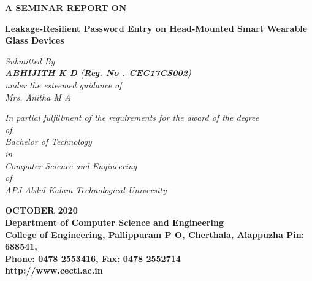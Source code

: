 \documentclass[12pt,a4paper,oneside]{report}
\begin{document}
\begin{titlepage}
\begin{center}

\large{\textbf{A SEMINAR REPORT ON}}\\
\begin{singlespace}
\LARGE{\textbf{Leakage-Resilient Password Entry on Head-Mounted Smart Wearable Glass Devices}}\\
\end{singlespace}


\Large{\textit{Submitted By }}\\
\Large{\textit{\textbf{ABHIJITH K D}     (\textbf{Reg. No . CEC17CS002})}}\\
\Large{\textit{\textit{under the esteemed guidance of}}}\\
\Large{\textit{Mrs. Anitha M A}}\\
\begin{singlespace}
\large{\textit{In partial fulfillment of the requirements for the award of the degree}\\
\large{ \textit{of}}\\
\large{\textit{Bachelor of Technology} }\\
\large{\textit{in}}\\
\large{\textit{Computer Science and Engineering}}\\
\large{\textit{of}}\\
\large{\textit{APJ Abdul Kalam Technological University}}}\\
\end{singlespace}
\begin{figure}[h]
\begin{center}
\end{center}
\end{figure}
\begin{singlespace}

\Large{\textbf{OCTOBER 2020\\Department of Computer Science and Engineering\\College of Engineering, Pallippuram P O, Cherthala, Alappuzha Pin: 688541, \\Phone: 0478 2553416, Fax: 0478 2552714\\http://www.cectl.ac.in}}
\end{singlespace}
\end{center}
\end{titlepage}
\end{document}
